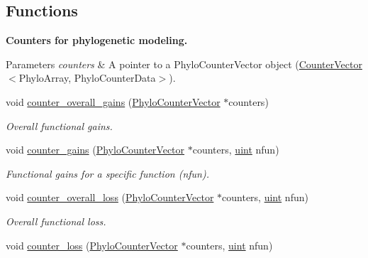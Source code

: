 \subsection*{Functions}
\begin{Indent}\textbf{ Counters for phylogenetic modeling.}\par
{\em 
\begin{DoxyParams}{Parameters}
{\em counters} & A pointer to a {\ttfamily Phylo\+Counter\+Vector} object ({\ttfamily \hyperlink{classbarry_1_1_counter_vector}{Counter\+Vector}}$<${\ttfamily Phylo\+Array}, {\ttfamily Phylo\+Counter\+Data}$>$). \\
\hline
\end{DoxyParams}
}\begin{DoxyCompactItemize}
\item 
void \hyperlink{namespacebarry_1_1counters_1_1phylo_a6f3a551165270e27f874d3df4d07cf8b}{counter\+\_\+overall\+\_\+gains} (\hyperlink{namespacebarry_1_1counters_1_1phylo_a2f117d1cd1dff67e1539cbc0aef5766a}{Phylo\+Counter\+Vector} $\ast$counters)
\begin{DoxyCompactList}\small\item\em Overall functional gains. \end{DoxyCompactList}\item 
void \hyperlink{namespacebarry_1_1counters_1_1phylo_a7f94d430b818b7bd9b2bcdc78ac2a29a}{counter\+\_\+gains} (\hyperlink{namespacebarry_1_1counters_1_1phylo_a2f117d1cd1dff67e1539cbc0aef5766a}{Phylo\+Counter\+Vector} $\ast$counters, \hyperlink{namespacebarry_a11dfc53ddb4672278319aa04f1e09a6c}{uint} nfun)
\begin{DoxyCompactList}\small\item\em Functional gains for a specific function ({\ttfamily nfun}). \end{DoxyCompactList}\item 
void \hyperlink{namespacebarry_1_1counters_1_1phylo_a45ae9af92d4821d218c99eaddaa9471e}{counter\+\_\+overall\+\_\+loss} (\hyperlink{namespacebarry_1_1counters_1_1phylo_a2f117d1cd1dff67e1539cbc0aef5766a}{Phylo\+Counter\+Vector} $\ast$counters, \hyperlink{namespacebarry_a11dfc53ddb4672278319aa04f1e09a6c}{uint} nfun)
\begin{DoxyCompactList}\small\item\em Overall functional loss. \end{DoxyCompactList}\item 
void \hyperlink{namespacebarry_1_1counters_1_1phylo_a095c62704de05d78bed1a77a4c5f4311}{counter\+\_\+loss} (\hyperlink{namespacebarry_1_1counters_1_1phylo_a2f117d1cd1dff67e1539cbc0aef5766a}{Phylo\+Counter\+Vector} $\ast$counters, \hyperlink{namespacebarry_a11dfc53ddb4672278319aa04f1e09a6c}{uint} nfun)

\end{DoxyCompactItemize}
\end{Indent}
